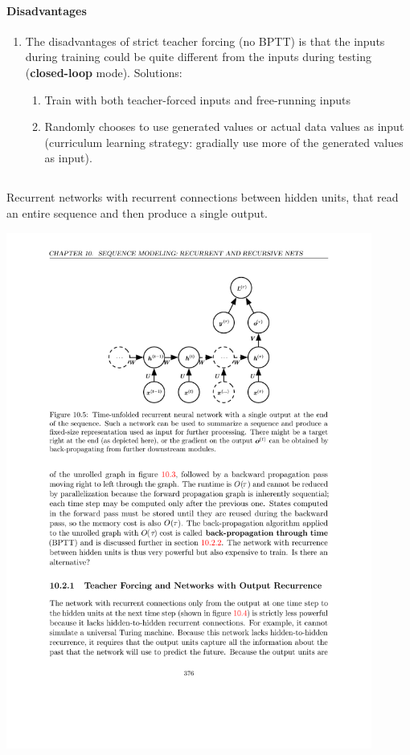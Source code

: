 \documentclass[12pt, a4paper]{article}
\begin{document}
\paragraph{Disadvantages}
\begin{enumerate}
    \item The disadvantages of strict teacher forcing (no BPTT) is that the inputs during training could be quite different from the inputs during testing (\textbf{closed-loop} mode).
        \newline Solutions:
        \begin{enumerate}
            \item Train with both teacher-forced inputs and free-running inputs
            \item Randomly chooses to use generated values or actual data values as input (curriculum learning strategy: gradially use more of the generated values as input).
        \end{enumerate}
\end{enumerate}

\subsection{}
Recurrent networks with recurrent connections between hidden units, that read an entire sequence and then produce a single output.
\begin{center}
    \includegraphics[width=0.9\textwidth]{../imgs/RNN_3.pdf}
\end{center}
\end{document}
